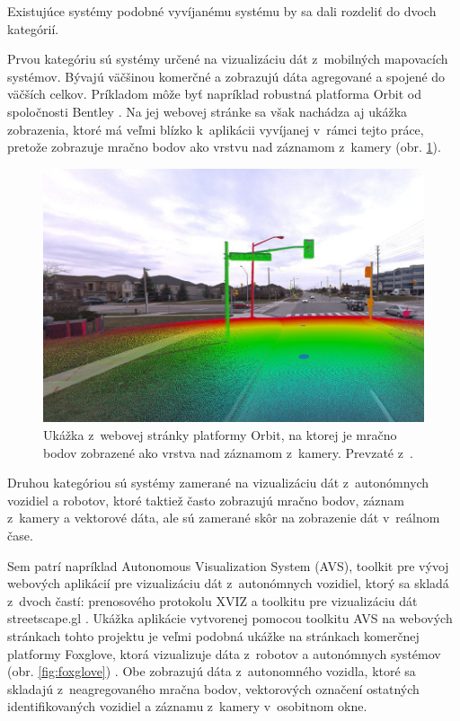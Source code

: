 Existujúce systémy podobné vyvíjanému systému by sa dali rozdeliť do dvoch kategórií.

Prvou kategóriu sú systémy určené na vizualizáciu dát z~mobilných mapovacích systémov. Bývajú väčšinou komerčné a zobrazujú dáta agregované a spojené do väčších celkov. Príkladom môže byť napríklad robustná platforma Orbit od spoločnosti Bentley \cite{orbit}. Na jej webovej stránke sa však nachádza aj ukážka zobrazenia, ktoré má veľmi blízko k~aplikácii vyvíjanej v~rámci tejto práce, pretože zobrazuje mračno bodov ako vrstvu nad záznamom z~kamery (obr. \ref{fig:orbit}).

\begin{figure}[h]
    \centering
    \includegraphics[width=0.6\linewidth]{text_prace/obrazky-figures/Orbit.jpg}
    \caption[Ukážka z~webovej stránky platformy Orbit.]{Ukážka z~webovej stránky platformy Orbit, na ktorej je mračno bodov zobrazené ako vrstva nad záznamom z~kamery. Prevzaté z~\cite{orbit}.}
    \label{fig:orbit}
\end{figure}

Druhou kategóriou sú systémy zamerané na vizualizáciu dát z~autonómnych vozidiel a robotov, ktoré taktiež často zobrazujú mračno bodov, záznam z~kamery a vektorové dáta, ale sú zamerané skôr na zobrazenie dát v~reálnom čase. 

Sem patrí napríklad Autonomous Visualization System (AVS), toolkit pre vývoj webových aplikácií pre vizualizáciu dát z~autonómnych vozidiel, ktorý sa skladá z~dvoch častí: prenosového protokolu XVIZ a toolkitu pre vizualizáciu dát streetscape.gl \cite{avs}. Ukážka aplikácie vytvorenej pomocou toolkitu AVS na webových stránkach tohto projektu je veľmi podobná ukážke na stránkach komerčnej platformy Foxglove, ktorá vizualizuje dáta z~robotov a autonómnych systémov (obr. \ref{fig:foxglove}) \cite{foxglove}. Obe zobrazujú dáta z~autonomného vozidla, ktoré sa skladajú z~neagregovaného mračna bodov, vektorových označení ostatných identifikovaných vozidiel a záznamu z~kamery v~osobitnom okne.

